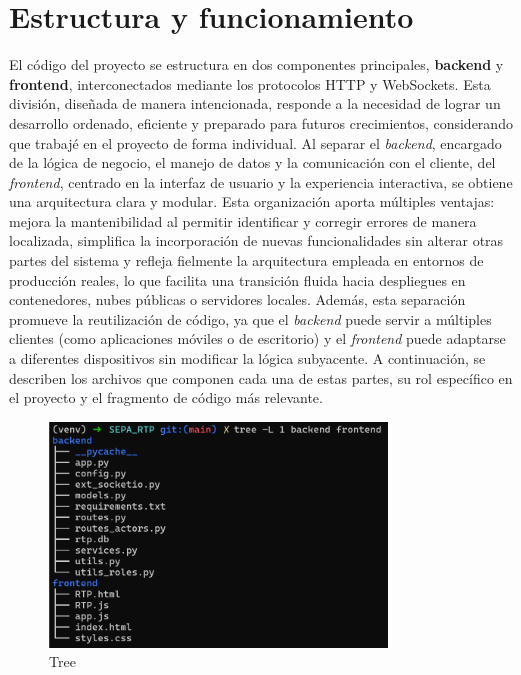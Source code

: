 \section{Estructura y funcionamiento}
\label{subsec:Estructura}
El código del proyecto se estructura en dos componentes principales, \textbf{backend} y \textbf{frontend}, interconectados mediante los protocolos HTTP y WebSockets. Esta división, diseñada de manera intencionada, responde a la necesidad de lograr un desarrollo ordenado, eficiente y preparado para futuros crecimientos, considerando que trabajé en el proyecto de forma individual. Al separar el \textit{backend}, encargado de la lógica de negocio, el manejo de datos y la comunicación con el cliente, del \textit{frontend}, centrado en la interfaz de usuario y la experiencia interactiva, se obtiene una arquitectura clara y modular. Esta organización aporta múltiples ventajas: mejora la mantenibilidad al permitir identificar y corregir errores de manera localizada, simplifica la incorporación de nuevas funcionalidades sin alterar otras partes del sistema y refleja fielmente la arquitectura empleada en entornos de producción reales, lo que facilita una transición fluida hacia despliegues en contenedores, nubes públicas o servidores locales. Además, esta separación promueve la reutilización de código, ya que el \textit{backend} puede servir a múltiples clientes (como aplicaciones móviles o de escritorio) y el \textit{frontend} puede adaptarse a diferentes dispositivos sin modificar la lógica subyacente. A continuación, se describen los archivos que componen cada una de estas partes, su rol específico en el proyecto y el fragmento de código más relevante.

\begin{figure}[H]
  \centering
  \includegraphics[width=0.8\textwidth]{Imagenes/treeB.png}
  \caption{Tree}
  \label{fig:Tree}
\end{figure}

